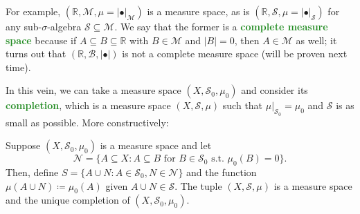\documentclass[11pt]{scrartcl}
\providecommand{\RR}{\mathbb R}
\providecommand{\vocab}[1]{{\textbf{\textcolor{ForestGreen}{#1}}}}
\providecommand{\abs}[1]{\left\lvert #1\right\rvert}
\begin{document}
For example, $(\RR, \mathcal M, \mu = \abs{\bullet}_{\mathcal M})$
is a measure space, as is $(\RR, \mathcal S, \mu = \abs{\bullet}_{\mathcal S})$
for any sub-$\sigma$-algebra $\mathcal S\subseteq\mathcal M$.
We say that the former is a \vocab{complete measure space}
because if $A\subseteq B\subseteq\RR$ with $B\in\mathcal M$ and $\abs B = 0$,
then $A\in\mathcal M$ as well; it turns out that
$(\RR, \mathcal B, \abs\bullet)$ is not a complete measure space
(will be proven next time).

In this vein, we can take a measure space $(X,\mathcal S_0,\mu_0)$
and consider its \vocab{completion}, which is a measure space
$(X,\mathcal S, \mu)$ such that $\mu|_{\mathcal S_0} = \mu_0$
and $\mathcal S$ is as small as possible. More constructively:

\pagebreak

\begin{prop}
    Suppose $(X,\mathcal S_0,\mu_0)$ is a measure space
    and let
    \begin{equation*}
        \mathcal N = \{A\subseteq X : A\subseteq B\text{ for }B\in\mathcal S_0
	\text{ s.t. }\mu_0(B) = 0\}.
    \end{equation*}
    Then, define $S = \{A\cup N : A\in\mathcal S_0, N\in\mathcal N\}$
    and the function $\mu(A\cup N) \coloneq \mu_0(A)$
    given $A\cup N\in\mathcal S$.
    The tuple $(X,\mathcal S, \mu)$ is a measure space and the unique
    completion of $(X,\mathcal S_0,\mu_0)$.
\end{prop}
\end{document}
